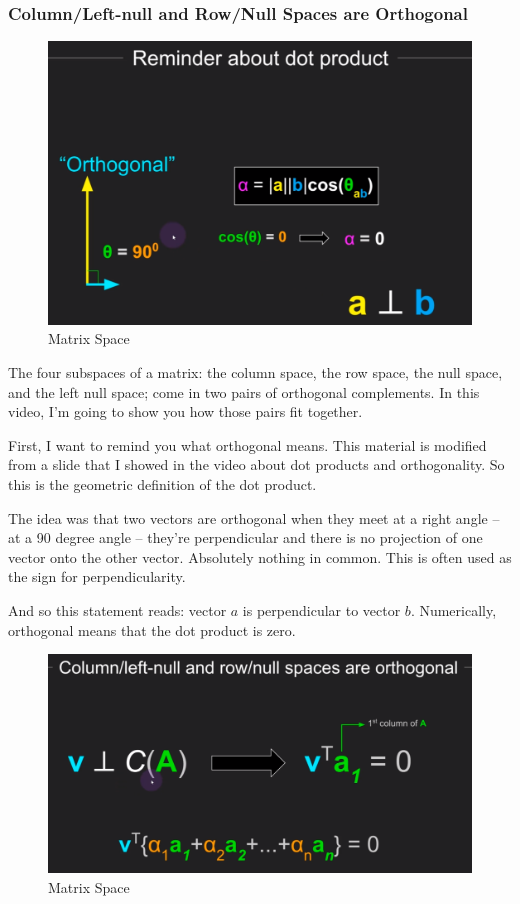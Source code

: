 \documentclass[fleqn,10pt]{olplainarticle}
\theoremstyle{definition}
\theoremstyle{remark}
\begin{document}
\pagebreak

\subsubsection*{Column/Left-null and Row/Null Spaces are Orthogonal}

\begin{figure}[ht]
	\centering
	\includegraphics[width=0.6\linewidth]{images/matrix-space-26.png}
	\caption{Matrix Space}
	\label{fig:matrix_space_26}
\end{figure}

The four subspaces of a matrix: the column space, the row space, the null space, and the left null space; come in two pairs of orthogonal complements. In this video, I'm going to show you how those pairs fit together.

First, I want to remind you what orthogonal means. This material is modified from a slide that I showed in the video about dot products and orthogonality. So this is the geometric definition of the dot product.

The idea was that two vectors are orthogonal when they meet at a right angle -- at a 90 degree angle -- they're perpendicular and there is no projection of one vector onto the other vector. Absolutely nothing in common. This is often used as the sign for perpendicularity.

And so this statement reads: vector $a$ is perpendicular to vector $b$. Numerically, orthogonal means that the dot product is zero.

\begin{figure}[ht]
	\centering
	\includegraphics[width=0.6\linewidth]{images/matrix-space-27.png}
	\caption{Matrix Space}
	\label{fig:matrix_space_27}
\end{figure}
\end{document}
